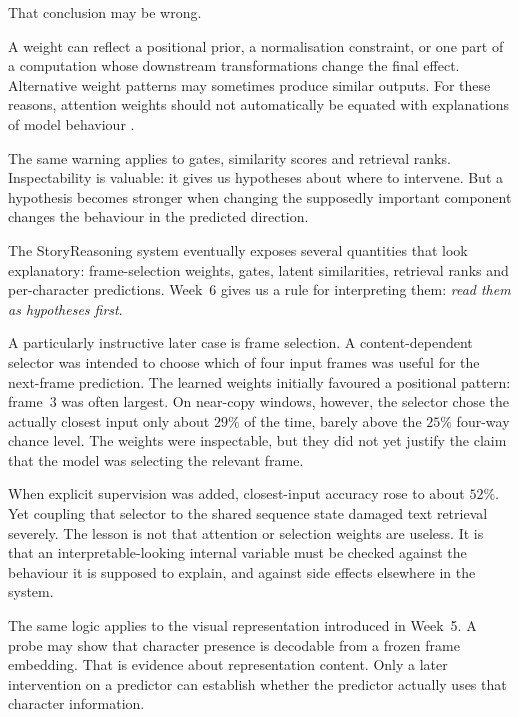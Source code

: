 That conclusion may be wrong.

A weight can reflect a positional prior, a normalisation constraint, or one part of a computation whose downstream transformations change the final effect. Alternative weight patterns may sometimes produce similar outputs. For these reasons, attention weights should not automatically be equated with explanations of model behaviour \parencite{jain2019}.

The same warning applies to gates, similarity scores and retrieval ranks. Inspectability is valuable: it gives us hypotheses about where to intervene. But a hypothesis becomes stronger when changing the supposedly important component changes the behaviour in the predicted direction.

\begin{architecturebox}
The StoryReasoning system eventually exposes several quantities that look explanatory: frame-selection weights, gates, latent similarities, retrieval ranks and per-character predictions. Week~6 gives us a rule for interpreting them: \emph{read them as hypotheses first}.

A particularly instructive later case is frame selection. A content-dependent selector was intended to choose which of four input frames was useful for the next-frame prediction. The learned weights initially favoured a positional pattern: frame~3 was often largest. On near-copy windows, however, the selector chose the actually closest input only about \(29\%\) of the time, barely above the \(25\%\) four-way chance level. The weights were inspectable, but they did not yet justify the claim that the model was selecting the relevant frame.

When explicit supervision was added, closest-input accuracy rose to about \(52\%\). Yet coupling that selector to the shared sequence state damaged text retrieval severely. The lesson is not that attention or selection weights are useless. It is that an interpretable-looking internal variable must be checked against the behaviour it is supposed to explain, and against side effects elsewhere in the system.

The same logic applies to the visual representation introduced in Week~5. A probe may show that character presence is decodable from a frozen frame embedding. That is evidence about representation content. Only a later intervention on a predictor can establish whether the predictor actually uses that character information.
\end{architecturebox}

